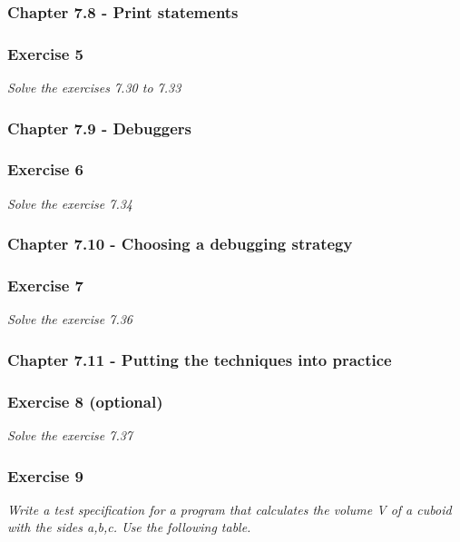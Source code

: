 \subsubsection{Chapter 7.8 - Print statements}

\subsubsection*{Exercise 5}
\textit{Solve the exercises 7.30 to 7.33} \\


\subsubsection{Chapter 7.9 - Debuggers}

\subsubsection*{Exercise 6}
\textit{Solve the exercise 7.34} \\

\subsubsection{Chapter 7.10 - Choosing a debugging strategy}

\subsubsection*{Exercise 7}
\textit{Solve the exercise 7.36}

\subsubsection{Chapter 7.11 - Putting the techniques into practice}

\subsubsection*{Exercise 8 (optional)}
\textit{Solve the exercise 7.37}

\subsubsection*{Exercise 9}
\textit{Write a test specification for a program that calculates the volume V
of a cuboid with the sides a,b,c. Use the following table.}

